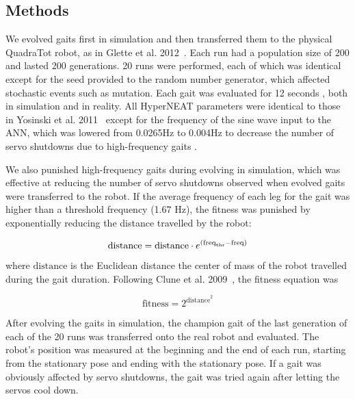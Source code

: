 
\subsection{Methods}

We evolved gaits first in simulation and then transferred them to the physical QuadraTot robot, as in Glette et al. 2012~\cite{glette}. 
Each run had a population size of 200 and lasted 200 generations. 20 runs were performed, each of which was identical except for the seed provided to the random number generator, which affected stochastic events such as mutation. 
Each gait was evaluated for 12 seconds , both in simulation and in reality. 
All HyperNEAT parameters were identical to those in Yosinski et al. 2011~\cite{yos:clune} except for the frequency of the sine wave input to the ANN, which was lowered from 0.0265Hz to 0.004Hz to decrease the number of servo shutdowns due to high-frequency gaits . 


%
%

We also punished high-frequency gaits during evolving in simulation, which was effective at reducing the number of servo shutdowns observed when evolved gaits were transferred to the robot. 
If the average frequency of each leg  for the gait was higher than a threshold frequency (1.67 Hz), the fitness was punished by exponentially reducing the distance travelled by the robot:

\begin{equation}
\mathrm{distance} = \mathrm{distance} \cdot e^{(\mathrm{freq}_{\mathrm{thr}}-\mathrm{freq})} \\
\end{equation}

\noindent where \emph{$\mathrm{distance}$} is the Euclidean distance the center of mass of the robot travelled during the gait duration. Following Clune et al. 2009~\cite{clune2009evolving}, the fitness equation was 

\begin{equation}
\mathrm{fitness} = 2^{\mathrm{distance}^{2}}
\end{equation}

After evolving the gaits in simulation, the champion gait of the last generation of each of the 20 runs was transferred onto the real robot and evaluated.
The robot's position was measured at the beginning and the end of each run, starting from the stationary pose and ending with the stationary pose. 
If a gait was obviously affected by servo shutdowns, the gait was tried again after letting the servos cool down. 

